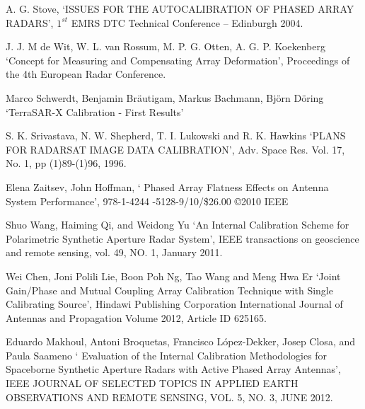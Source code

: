 \documentclass[a4paper,10pt]{article}
\begin{document}
\begin{enumerate}[ {[}1{]} ]
		\item \label{ppr:classic6} A. G. Stove, \enquote*{ISSUES FOR THE 
		AUTOCALIBRATION OF PHASED ARRAY RADARS}, $1^{st}$ EMRS DTC Technical 
		Conference – Edinburgh 2004.
		
		\item \label{ppr:aligment4} J. J. M de Wit, W. L. van Rossum, M. P. G. 
		Otten, A. G. P. Koekenberg \enquote*{Concept for Measuring and 
		Compensating Array Deformation}, Proceedings of the 4th European Radar 
		Conference.
		
		\item \label{ppr:rad7} Marco Schwerdt, Benjamin Bräutigam, Markus 
		Bachmann, Björn Döring \enquote*{TerraSAR-X Calibration - First Results}

		\item \label{ppr:classic-ext1} S. K. Srivastava, N. W. Shepherd, T. I. 
		Lukowski and R. K. Hawkins \enquote*{PLANS FOR RADARSAT IMAGE DATA
		CALIBRATION}, Adv. Space Res. Vol. 17, No. 1, pp (1)89-(1)96, 1996.

		\item \label{ppr:aligment5} Elena Zaitsev, John Hoffman, \enquote*{
		Phased Array Flatness Effects on Antenna System Performance}, 978-1-4244
		-5128-9/10/\$26.00 \copyright 2010 IEEE

		\item \label{ppr:classic7} Shuo Wang, Haiming Qi, and Weidong Yu 
		\enquote*{An Internal Calibration Scheme for Polarimetric Synthetic 
		Aperture Radar System}, IEEE transactions on geoscience and remote 
		sensing, vol. 49, NO. 1, January 2011.
		
		\item \label{ppr:mutual-ext1} Wei Chen, Joni Polili Lie, Boon Poh Ng, 
		Tao Wang and Meng Hwa Er \enquote*{Joint Gain/Phase and Mutual Coupling
		Array Calibration Technique with Single Calibrating Source}, Hindawi 
		Publishing Corporation International Journal of Antennas and Propagation
		Volume 2012, Article ID 625165.

		
		\item \label{ppr:classic8} Eduardo Makhoul, Antoni Broquetas, 
		Francisco López-Dekker, Josep Closa, and Paula Saameno \enquote*{
		Evaluation of the Internal Calibration Methodologies for Spaceborne 
		Synthetic Aperture Radars with Active Phased Array Antennas}, IEEE 
		JOURNAL OF SELECTED TOPICS IN APPLIED EARTH OBSERVATIONS AND REMOTE 
		SENSING, VOL. 5, NO. 3, JUNE 2012.


\end{enumerate}
\end{document}
